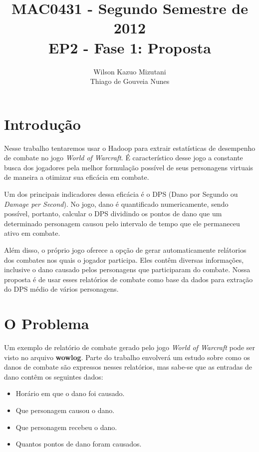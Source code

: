 \documentclass[a4paper,11pt]{article}
\title{MAC0431 - Segundo Semestre de 2012 \\
       EP2 - Fase 1: Proposta}
\author{Wilson Kazuo Mizutani \\ Thiago de Gouveia Nunes}
\begin{document}
\maketitle

\section{Introdução}

  Nesse trabalho tentaremos usar o Hadoop para extrair estatísticas de
  desempenho de combate no jogo \textit{World of Warcraft}. É característico
  desse jogo a constante busca dos jogadores pela melhor formulação possível de
  seus personagens virtuais de maneira a otimizar sua eficácia em combate.
  
  Um dos principais indicadores dessa eficácia é o DPS (Dano por Segundo ou
  \textit{Damage per Second}). No jogo, dano é quantificado numericamente, sendo
  possível, portanto, calcular o DPS dividindo os pontos de dano que um
  determinado personagem causou pelo intervalo de tempo que ele permaneceu ativo
  em combate.
  
  Além disso, o próprio jogo oferece a opção de gerar automaticamente relátorios
  dos combates nos quais o jogador participa. Eles contêm diversas informações,
  inclusive o dano causado pelos personagens que participaram do combate.
  Nossa proposta é de usar esses relatórios de combate como base da dados para
  extração do DPS médio de vários personagens.

\section{O Problema}

  Um exemplo de relatório de combate gerado pelo jogo \textit{World of Warcraft}
  pode ser visto no arquivo \textbf{\LARGE{wowlog}}. Parte do trabalho
  envolverá um estudo sobre como os danos de combate são expressos nesses
  relatórios, mas sabe-se que as entradas de dano contêm os seguintes dados:
  
  \begin{itemize}
  
    \item Horário em que o dano foi causado.
    \item Que personagem causou o dano.
    \item Que personagem recebeu o dano.
    \item Quantos pontos de dano foram causados.
  
  \end{itemize}
  
\end{document}
